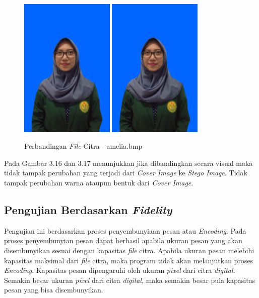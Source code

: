 	\begin{figure}[H]
		\centering
		\includegraphics[width=0.4\textwidth]{gambar/matlab/amelia}
		\includegraphics[width=0.4\textwidth]{gambar/matlab/amelia_kalimat}
		\caption{Perbandingan \emph{File} Citra - amelia.bmp}
		\label{amelia_stego}		
	\end{figure}


	Pada Gambar 3.16 dan 3.17 menunjukkan jika dibandingkan secara visual maka tidak tampak perubahan yang terjadi dari \emph{Cover Image} ke \emph{Stego Image}. Tidak tampak perubahan warna ataupun bentuk dari \emph{Cover Image}.

	\subsection{Pengujian Berdasarkan \emph{Fidelity}}
	Pengujian ini berdasarkan proses penyembunyiaan pesan atau \emph{Encoding}. Pada proses penyembunyian pesan dapat berhasil apabila ukuran pesan yang akan disembunyikan sesuai dengan kapasitas \emph{file} citra. Apabila ukuran pesan melebihi kapasitas maksimal dari \emph{file} citra, maka program tidak akan melanjutkan proses \emph{Encoding}. Kapasitas pesan dipengaruhi oleh ukuran \emph{pixel} dari citra \emph{digital}. Semakin besar ukuran \emph{pixel} dari citra \emph{digital}, maka semakin besar pula kapasitas pesan yang bisa disembunyikan.
	
